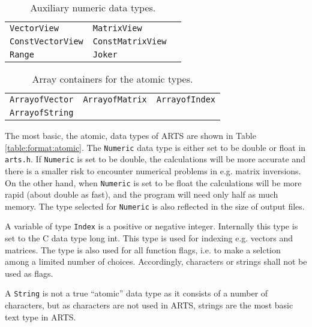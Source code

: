  \begin{table}[t]
  \begin{tabular}{p{4cm} p{4cm} p{4cm}}
   \verb|VectorView|         & \verb|MatrixView|         \\
   \verb|ConstVectorView|    & \verb|ConstMatrixView|    \\
   \verb|Range|              & \verb|Joker| \\
  \end{tabular}
  \caption{Auxiliary numeric data types.}
  \label{table:format:numaux}
 \end{table}

 \begin{table}[t]
  \begin{tabular}{p{4cm} p{4cm} p{4cm}}
   \verb|ArrayofVector|  & \verb|ArrayofMatrix|  & \verb|ArrayofIndex|   \\
   \verb|ArrayofString|  &                       &                        \\
  \end{tabular}
  \caption{Array containers for the atomic types.}
  \label{table:format:atomicarrays}
 \end{table}

\label{sec:formats:atomic}
 
The most basic, the atomic, data types of ARTS are shown in Table
\ref{table:format:atomic}. The \verb|Numeric| data type is either set
to be double or float in \verb|arts.h|. If \verb|Numeric| is set to be
double, the calculations will be more accurate and there is a smaller
risk to encounter numerical problems in e.g. matrix inversions.  On
the other hand, when \verb|Numeric| is set to be float the
calculations will be more rapid (about double as fast), and the
program will need only half as much memory. The type selected for
\verb|Numeric| is also reflected in the size of output files.

A variable of type \verb|Index| is a positive or negative integer.
Internally this type is set to the C data type long int.  This type is
used for indexing e.g. vectors and matrices. The type is also used for
all function flags, i.e. to make a selction among a limited number of
choices. Accordingly, characters or strings shall not be used as
flags.

A \verb|String| is not a true ``atomic'' data type as it consists of a
number of characters, but as characters are not used in ARTS, strings
are the most basic text type in ARTS.
  

\label{sec:formats:nummath}
 
